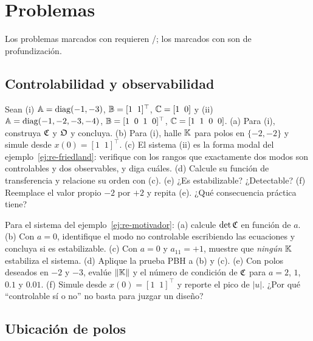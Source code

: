 \section{Problemas}
\label{sec:re-problemas}

Los problemas marcados con \etiquetaM{} requieren \matlab/\simulink; los marcados con \etiquetaEstrella{} son de profundización.

\subsection*{Controlabilidad y observabilidad}

\begin{problema}[estructura]\label{prob:re-estructura}
Sean (i) $\mathbb{A}=\operatorname{diag}(-1,-3)$, $\mathbb{B}=[1\;\;1]^\top$, $\mathbb{C}=[1\;\;0]$ y (ii) $\mathbb{A}=\operatorname{diag}(-1,-2,-3,-4)$, $\mathbb{B}=[1\;\;0\;\;1\;\;0]^\top$, $\mathbb{C}=[1\;\;1\;\;0\;\;0]$. (a) Para (i), construya $\mathfrak{C}$ y $\mathfrak{O}$ y concluya. (b) Para (i), halle $\mathbb{K}$ para polos en $\{-2,-2\}$ y simule desde $x(0)=[1\;\;1]^\top$. (c) El sistema (ii) es la forma modal del ejemplo~\ref{ej:re-friedland}: verifique con los rangos que exactamente dos modos son controlables y dos observables, y diga cuáles. (d) Calcule su función de transferencia y relacione su orden con (c). (e) ¿Es estabilizable? ¿Detectable? (f) Reemplace el valor propio $-2$ por $+2$ y repita (e). ¿Qué consecuencia práctica tiene?
\end{problema}

\begin{problema}\label{prob:re-cuantitativa}
\etiquetaEstrella{} Para el sistema del ejemplo~\ref{ej:re-motivador}: (a) calcule $\det\mathfrak{C}$ en función de $a$. (b) Con $a=0$, identifique el modo no controlable escribiendo las ecuaciones y concluya si es estabilizable. (c) Con $a=0$ y $a_{11}=+1$, muestre que \emph{ningún} $\mathbb{K}$ estabiliza el sistema. (d) Aplique la prueba PBH a (b) y (c). (e) Con polos deseados en $-2$ y $-3$, evalúe $\|\mathbb{K}\|$ y el número de condición de $\mathfrak{C}$ para $a=2$, $1$, $0.1$ y $0.01$. (f) \etiquetaM{} Simule desde $x(0)=[1\;\;1]^\top$ y reporte el pico de $|u|$. ¿Por qué ``controlable sí o no'' no basta para juzgar un diseño?
\end{problema}

\subsection*{Ubicación de polos}


